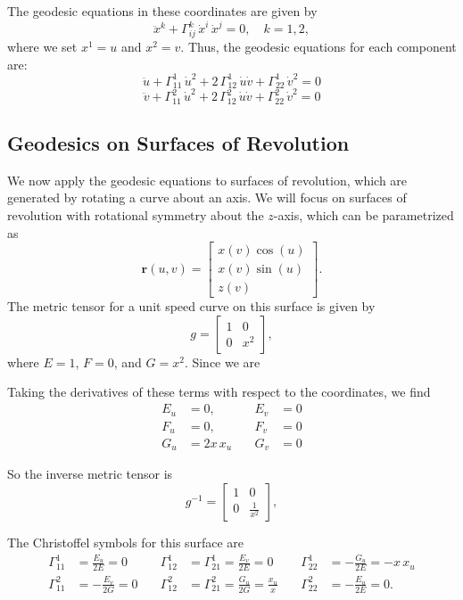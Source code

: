 \documentclass[12pt]{article}
\begin{document}
The geodesic equations in these coordinates are given by
\[
\ddot{x}^k + \Gamma^k_{ij}\,\dot{x}^i\,\dot{x}^j = 0,\quad k=1,2,
\]
where we set \(x^1=u\) and \(x^2=v\). Thus, the geodesic equations for each component are:
\begin{equation}
    \ddot{u} + \Gamma^1_{11}\,\dot{u}^2 + 2\,\Gamma^1_{12}\,\dot{u}\dot{v} + \Gamma^1_{22}\,\dot{v}^2 = 0
\end{equation}
\begin{equation}
    \ddot{v} + \Gamma^2_{11}\,\dot{u}^2 + 2\,\Gamma^2_{12}\,\dot{u}\dot{v} + \Gamma^2_{22}\,\dot{v}^2 = 0
\end{equation}


\subsection{Geodesics on Surfaces of Revolution}

We now apply the geodesic equations to surfaces of revolution, which are generated by rotating a curve about an axis.
We will focus on surfaces of revolution with rotational symmetry about the \(z\)-axis, which can be parametrized as
\[
\mathbf{r}(u, v) = \begin{bmatrix} x(v) \cos (u) \\ x(v) \sin (u) \\ z(v) \end{bmatrix}.
\]
The metric tensor for a unit speed curve on this surface is given by
\[
g = \begin{bmatrix} 1 & 0 \\ 0 & x^2 \end{bmatrix},
\]
where $E = 1$, $F = 0$, and $G = x^2$.
Since we are 

Taking the derivatives of these terms with respect to the coordinates, we find
\[
\begin{aligned}
E_u &= 0, &\quad E_v &= 0 \\
F_u &= 0, &\quad F_v &= 0 \\
G_u &= 2x\,x_{u} &\quad G_v &= 0
\end{aligned}
\]

So the inverse metric tensor is
\[
g^{-1} = \begin{bmatrix} 1 & 0 \\[4mm] 0 & \frac{1}{x^2} \end{bmatrix},
\]

The Christoffel symbols for this surface are
\[
\begin{aligned}
    \Gamma_{11}^{1} &= \frac{E_{u}}{2E} = 0 &\quad \Gamma_{12}^{1} &= \Gamma_{21}^{1} = \frac{E_{v}}{2E} = 0 &\quad \Gamma_{22}^{1} &= -\frac{G_{u}}{2E} = -x\,x_{u} \\[4mm]
    \Gamma_{11}^{2} &= -\frac{E_{v}}{2G} = 0 &\quad \Gamma_{12}^{2} &= \Gamma_{21}^{2} = \frac{G_{u}}{2G} = \frac{x_{u}}{x} &\quad \Gamma_{22}^{2} &= -\frac{E_{u}}{2E} = 0.
\end{aligned}
\]
\end{document}
